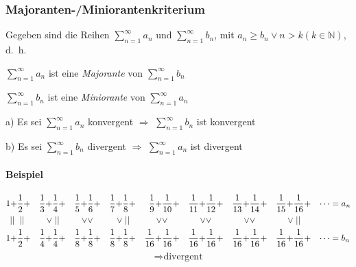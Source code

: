 \subsubsection{Majoranten-/Miniorantenkriterium}

Gegeben sind die Reihen \( \sum\limits^{\infty}_{n=1} a_n \) und  \( \sum\limits^{\infty}_{n=1} b_n \), mit \( a_n \geq b_n \vee n > k (k \in \mathbb{N}) \), d.~h.

\begin{center}

	\( \sum\limits^{\infty}_{n=1} a_n \) ist eine \textit{Majorante} von \( \sum\limits^{\infty}_{n=1} b_n \)


	\medskip

	\( \sum\limits^{\infty}_{n=1} b_n \) ist eine \textit{Miniorante} von \( \sum\limits^{\infty}_{n=1} a_n \)

	\bigskip

	a) Es sei \( \sum\limits^{\infty}_{n=1} a_n \) konvergent \(\Rightarrow\) \( \sum\limits^{\infty}_{n=1} b_n \) ist konvergent

	\medskip

	b) Es sei \( \sum\limits^{\infty}_{n=1} b_n \) divergent \(\Rightarrow\) \( \sum\limits^{\infty}_{n=1} a_n \) ist divergent

\end{center}

\paragraph{Beispiel}

\begin{align*}
	1 +     & \frac{1}{2} + & \frac{1}{3} + & \frac{1}{4} + & \frac{1}{5} + & \frac{1}{6} + & \frac{1}{7} + & \frac{1}{8} + & \frac{1}{9} +  & \frac{1}{10} + & \frac{1}{11} + & \frac{1}{12} + & \frac{1}{13} + & \frac{1}{14} + & \frac{1}{15} + & \frac{1}{16} + & \cdots & = a_n \\
	\mid\mid{} & \mid\mid{}       & \vee          & \mid\mid{}       & \vee          & \vee          & \vee          & \mid\mid{}       & \vee           & \vee           & \vee           & \vee           & \vee           & \vee           & \vee           & \mid\mid{}        &        &       \\
	1 +     & \frac{1}{2} + & \frac{1}{4} + & \frac{1}{4} + & \frac{1}{8} + & \frac{1}{8} + & \frac{1}{8} + & \frac{1}{8} + & \frac{1}{16} + & \frac{1}{16} + & \frac{1}{16} + & \frac{1}{16} + & \frac{1}{16} + & \frac{1}{16} + & \frac{1}{16} + & \frac{1}{16} + & \cdots & = b_n \\
\end{align*}
\[
	\Rightarrow \text{divergent}
\]

